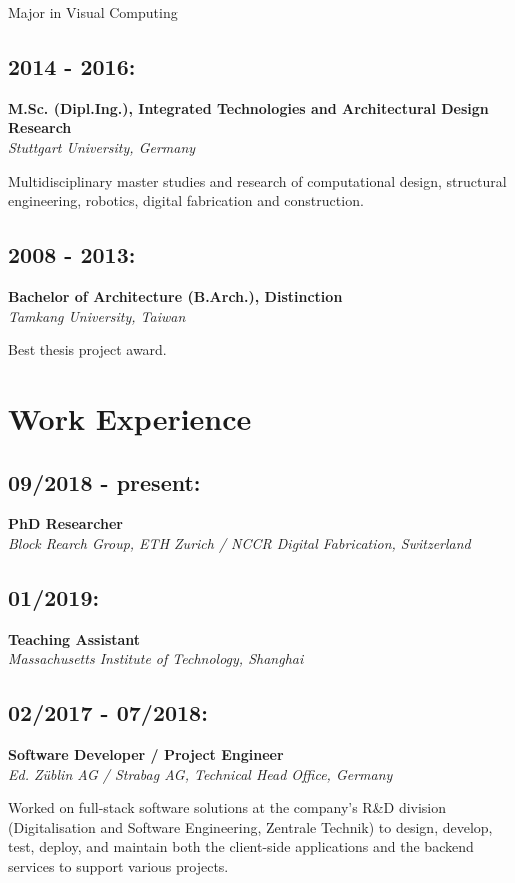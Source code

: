 \documentclass[a4paper, 9pt]{article}
\begin{document}
Major in Visual Computing

\subsection{2014 - 2016:}
\label{sec:org27517dc}
\textbf{M.Sc. (Dipl.Ing.), Integrated Technologies and Architectural Design Research} \\
\emph{Stuttgart University, Germany}

Multidisciplinary master studies and research of computational design, structural engineering, 
robotics, digital fabrication and construction.

\subsection{2008 - 2013:}
\label{sec:org429f5fa}
\textbf{Bachelor of Architecture (B.Arch.), Distinction} \\
\emph{Tamkang University, Taiwan}

Best thesis project award. 


\section{Work Experience}
\label{sec:org47eb068}

\subsection{09/2018 - present:}
\label{sec:org9d3a81f}
\textbf{PhD Researcher} \\
\emph{Block Rearch Group, ETH Zurich / NCCR Digital Fabrication, Switzerland}

\subsection{01/2019:}
\label{sec:org7607707}
\textbf{Teaching Assistant} \\
\emph{Massachusetts Institute of Technology, Shanghai}

\subsection{02/2017 - 07/2018:}
\label{sec:org070c299}
\textbf{Software Developer / Project Engineer} \\
\emph{Ed. Züblin AG / Strabag AG, Technical Head Office, Germany}

Worked on full-stack software solutions at the company's R\&D division 
(Digitalisation and Software Engineering, Zentrale Technik) 
to design, develop, test, deploy, and maintain both the client-side applications and the 
backend services to support various projects. 
\end{document}
